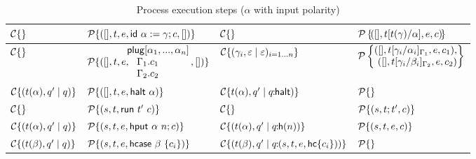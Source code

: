 \documentclass[11pt]{article}
\newcommand{\<}{\langle}
\renewcommand{\>}{\rangle}
\begin{document}
\begin{table}
\begin{center}
\begin{tabular}{|l|l||l|l|}
${\cal C}\{ \}$ & ${\cal P}\{ ([],t,e, {\sf id}~ \alpha:=\gamma;  c ,[]) \} $ 
              & ${\cal C}\{ \} $ & ${\cal P}\left\{ \! ( [],t[t(\gamma)/\alpha],e,c) \! \right\}$ \\ \hline
${\cal C}\{ \}$ & ${\cal P}\{ ([],t,e, \!\!\!\!\!\begin{array}[c]{l}{\sf plug} [\alpha_1,...,\alpha_n]\\
                           ~~~\Gamma_1. c_1 \\
                           ~~~\Gamma_2. c_2  \end{array}\!\!,[]) \} $ 
              & ${\cal C}\{ (\gamma_i,\varepsilon\mid\varepsilon)_{i=1...n}\} $ & ${\cal P}\left\{ \!\!\!\begin{array}[c]{r} ( [],t[\gamma_i/\alpha_i]_{\Gamma_1},e,c_1), \\ ([],t[\gamma_i/\beta_i]_{\Gamma_2},e,c_2) \end{array} \!\!\! \right\}$ \\ \hline
${\cal C}\{ (t(\alpha),q'\mid q) \}$ & ${\cal P}\{ ([],t,e,{\sf halt}~\alpha)\} $ & ${\cal C}\{ t(\alpha),q' \mid q\!\!:\!\!{\sf halt}) \}$ & ${\cal P}\{ \}$ \\ \hline
${\cal C}\{\}$ & ${\cal P}\{ (s,t,{\sf run}~t'~c) \}$ & ${\cal C}\{\}$  & ${\cal P}\{ (s,t;t',c) \}$ \\ \hline
${\cal C}\{ (t(\alpha),q' \mid q)\}$ & ${\cal P}\{ (s,t,e,{\sf hput}~\alpha~n;c) \}$ & 
${\cal C}\{ (t(\alpha),q' \mid q\!\!:\!\!{\sf h}(n))\} $ & ${\cal P}\{ (s,t,e,c) \}$ \\ \hline
${\cal C}\{ (t(\beta), q' \mid q) \} $ & ${\cal P}\{ (s,t,e,{\sf hcase} ~\beta~\{ c_i \}) \}$ & ${\cal C}\{ (t(\beta), q' \mid q\!\!:\!\!(s,t,e,{\sf hc}\{ c_i\})) \} $ & ${\cal P}\{ \}$ \\ \hline
\end{tabular}
\end{center}
\caption{Process execution steps ($\alpha$ with input polarity)}
\label{process-actions}
\end{table}
\end{document}
